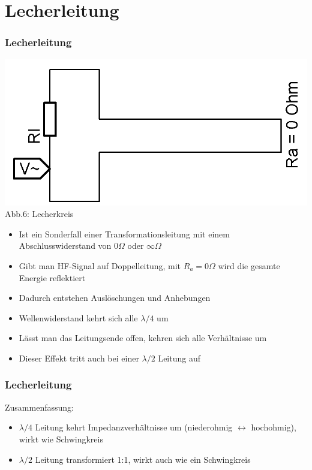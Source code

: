 \section*{Lecherleitung}
\begin{frame}
  \frametitle{Lecherleitung}
  \begin{center}
    \includegraphics[width=\textwidth,height=.3\textheight,keepaspectratio]{a10/Lecherkreis.png}\\
    {\tiny Abb.6: Lecherkreis}
  \end{center}
  \begin{itemize}
    \item Ist ein Sonderfall einer Transformationsleitung mit einem Abschlusswiderstand von $0 \Omega$ oder $\infty \Omega$
    \item Gibt man HF-Signal auf Doppelleitung, mit $R_a = 0 \Omega$ wird die gesamte Energie reflektiert
    \item Dadurch entstehen Auslöschungen und Anhebungen
    \item Wellenwiderstand kehrt sich alle $\lambda /4$ um
    \item Lässt man das Leitungsende offen, kehren sich alle Verhältnisse um
    \item Dieser Effekt tritt auch bei einer $\lambda /2$ Leitung auf
  \end{itemize}
\end{frame}

\begin{frame}
    \frametitle{Lecherleitung}

    Zusammenfassung:
    
    \begin{itemize}
        \item	$\lambda /4$ Leitung kehrt Impedanzverhältnisse um (niederohmig $\leftrightarrow$ hochohmig), wirkt wie Schwingkreis
        \item	$\lambda /2$ Leitung transformiert 1:1, wirkt auch wie ein Schwingkreis
    \end{itemize}

\end{frame}

